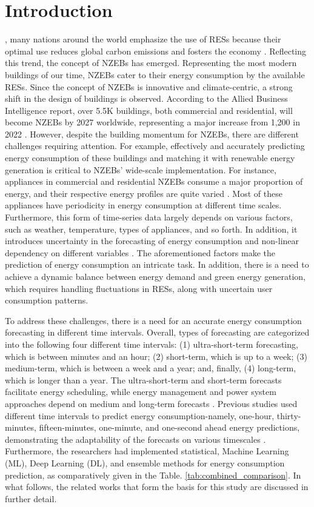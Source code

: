 \documentclass[journal]{IEEEtran}
\begin{document}
\IEEEpeerreviewmaketitle
\section{Introduction}

, many nations around the world emphasize the use of RESs \cite{Ref18} because their optimal use reduces global carbon emissions and fosters the economy \cite{Ref19}. Reflecting this trend, the concept of NZEBs has emerged. Representing the most modern buildings of our time, NZEBs cater to their energy consumption by the available RESs. Since the concept of NZEBs is innovative and climate-centric, a strong shift in the design of buildings is observed. According to the Allied Business Intelligence report, over 5.5K buildings, both commercial and residential, will become NZEBs by 2027 worldwide, representing a major increase from 1,200 in 2022 \cite{Ref31}. However, despite the building momentum for NZEBs, there are different challenges requiring attention. For example, effectively and accurately predicting energy consumption of these buildings and matching it with renewable energy generation is critical to NZEBs' wide-scale implementation. For instance, appliances in commercial and residential NZEBs consume a major proportion of energy, and their respective energy profiles are quite varied \cite{Ref18}. Most of these appliances have periodicity in energy consumption at different time scales. Furthermore, this form of time-series data largely depends on various factors, such as weather, temperature, types of appliances, and so forth. In addition, it introduces uncertainty in the forecasting of energy consumption and non-linear dependency on different variables \cite{Ref22}. The aforementioned factors make the prediction of energy consumption an intricate task. In addition, there is a need to achieve a dynamic balance between energy demand and green energy generation, which requires handling fluctuations in RESs, along with uncertain user consumption patterns. 

To address these challenges, there is a need for an accurate energy consumption forecasting in different time intervals. Overall, types of forecasting are categorized into the following four different time intervals: (1) ultra-short-term forecasting, which is between minutes and an hour; (2) short-term, which is up to a week; (3) medium-term, which is between a week and a year; and, finally, (4) long-term, which is longer than a year. The ultra-short-term and short-term forecasts facilitate energy scheduling, while energy management and power system approaches depend on medium and long-term forecasts \cite{Ref32} \cite{Ref33}. Previous studies used different time intervals to predict energy consumption-namely, one-hour, thirty-minutes, fifteen-minutes, one-minute, and one-second ahead energy predictions, demonstrating the adaptability of the forecasts on various timescales \cite{Ref10}. Furthermore, the researchers had implemented statistical, Machine Learning (ML), Deep Learning (DL), and ensemble methods for energy consumption prediction, as comparatively given in the Table. \ref{tab:combined_comparison}. In what follows, the related works that form the basis for this study are discussed in further detail. 
\end{document}
